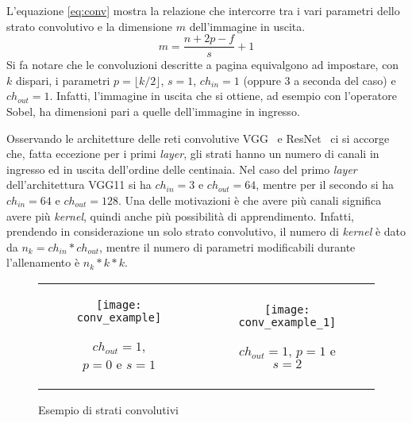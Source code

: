 L'equazione \ref{eq:conv} mostra la relazione che intercorre tra i vari parametri dello strato convolutivo e la dimensione $m$ dell'immagine in uscita.
\begin{equation} \label{eq:conv}
  m = \frac
  {n + 2p - f}
  {s} 
  + 1
\end{equation}
Si fa notare che le convoluzioni descritte a pagina \pageref{conv_para} equivalgono ad impostare, con $k$ dispari, i parametri $p=\lfloor k/2 \rfloor$, $s=1$, $ch_{in}=1$ (oppure 3 a seconda del caso) e $ch_{out}=1$.
Infatti, l'immagine in uscita che si ottiene, ad esempio con l'operatore Sobel, ha dimensioni pari a quelle dell'immagine in ingresso.

Osservando le architetture delle reti convolutive VGG~\cite{vgg} e ResNet~\cite{resnet} ci si accorge che, fatta eccezione per i primi \textit{layer}, gli strati hanno un numero di canali in ingresso ed in uscita dell'ordine delle centinaia.
Nel caso del primo \textit{layer} dell'architettura VGG11 si ha $ch_{in} = 3$ e $ch_{out} = 64$, mentre per il secondo si ha $ch_{in} = 64$ e $ch_{out} = 128$.
Una delle motivazioni è che avere più canali significa avere più \textit{kernel}, quindi anche più possibilità di apprendimento.
Infatti, prendendo in considerazione un solo strato convolutivo, il numero di \textit{kernel} è dato da $n_k = ch_{in}*ch_{out}$, mentre il numero di parametri modificabili durante l'allenamento è $n_k * k * k$.

\begin{figure}[ht]
  \begin{center}
  \begin{tabular}{cc}
    \begin{subfigure}{.49\linewidth}
      \centering\texttt{[image: conv\_example]}
      \caption{$ch_{out}=1$, $p=0$ e $s=1$}
      \label{fig:conv_layer_1ch}
    \end{subfigure} &

    \begin{subfigure}{.49\linewidth}
      \centering\texttt{[image: conv\_example\_1]}
      \caption{$ch_{out}=1$, $p=1$ e $s=2$}
      \label{fig:conv_layer_1ch_p1_s2}
    \end{subfigure}


  \end{tabular}
  \caption{Esempio di strati convolutivi}
  \label{fig:conv_layer}
  \end{center}
\end{figure}

